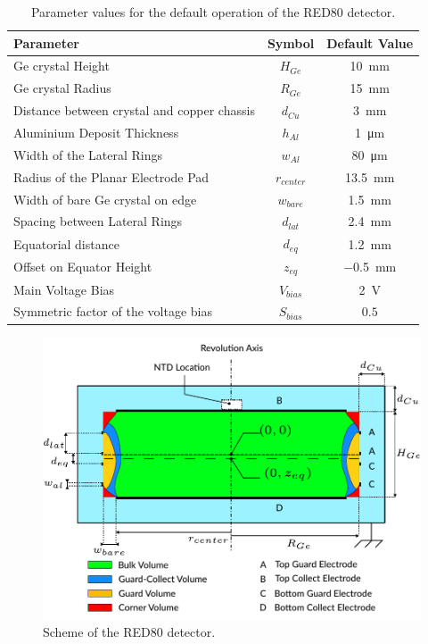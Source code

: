 \begin{table}[]
\centering
\begin{tabular}{l c S}
Parameter                                   & Symbol        & {Default Value} \\ \hline \hline
Ge crystal Height                           & $H_{Ge}$      & \SI{10}{\mm}  \\
Ge crystal Radius                           & $R_{Ge}$      & \SI{15}{\mm}    \\
Distance between crystal and copper chassis & $d_{Cu}$      & \SI{3}{\mm}     \\
Aluminium Deposit Thickness                         & $h_{Al}$      & \SI{1}{\micro\meter}   \\
Width of the Lateral Rings                      & $w_{Al}$      & \SI{80}{\micro\meter}  \\
Radius of the Planar Electrode Pad  & $r_{center}$   & \SI{13.5}{\mm}   \\
Width of bare Ge crystal on edge     & $w_{bare}$    & \SI{1.5}{\mm}  \\
Spacing between Lateral Rings          & $d_{lat}$  & \SI{2.4}{\mm}  \\
Equatorial distance						& $d_{eq}$	& \SI{1.2}{\mm} \\
Offset on Equator Height				& $z_{eq}$	& \SI{-0.5}{\mm} \\
Main Voltage Bias                           & $V_{bias}$    & \SI{2}{\volt}      \\
Symmetric factor of the voltage bias        & $S_{bias}$    & {$0.5$}         
\end{tabular}
\caption{Parameter values for the default operation of the RED80 detector.}
\label{tab:red80-default-parameters}
\end{table}


\begin{figure}
\centering
\includegraphics[scale=1]{Figures/ElectrodesExperimental/scheme_red80.pdf}
\caption{Scheme of the RED80 detector.}
\label{fig:red80-scheme}
\end{figure}

